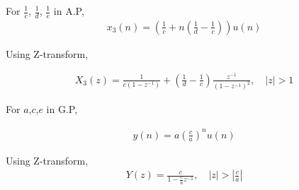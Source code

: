 \documentclass[journal,12pt,twocolumn]{IEEEtran}
\providecommand{\brak}[1]{\ensuremath{\left(#1\right)}}
\theoremstyle{remark}
\providecommand{\abs}[1]{\left\vert#1\right\vert}
\begin{document}
For $\frac{1}{c}$, $\frac{1}{d}$, $\frac{1}{e}$ in A.P,
\begin{align}
x_3(n) = \brak{\frac{1}{c} + n\brak{\frac{1}{d} - \frac{1}{c}}}u(n)
\end{align}

Using Z-transform,

\begin{align}
X_3(z) = \frac{1}{c(1-z^{-1})} + \brak{\frac{1}{d} - \frac{1}{c}}\frac{z^{-1}}{(1-z^{-1})^2} ,
\quad |z| > 1
\end{align}

For $a$,$c$,$e$ in G.P,

\begin{align}
y(n) = a\brak{\frac{c}{a}}^n u(n)
\end{align}

Using Z-transform,
\begin{align}
Y(z) = \frac{c}{1-\frac{c}{a}z^{-1}}, \quad \abs{z}>\abs{\frac{c}{a}}
\end{align}
\end{document}
